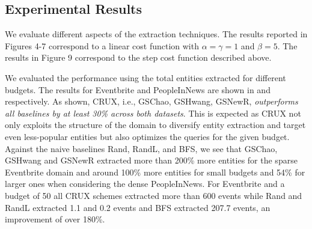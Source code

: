 
\subsection{Experimental Results}
We evaluate different aspects of the extraction techniques.
\iftr
 The results reported in Figures 4-7 correspond to a linear cost function with $\alpha=\gamma=1$ and $\beta=5$. The results in Figure 9 correspond to the step cost function described above.
 \fi

We evaluated the performance using the total entities 
extracted for different budgets. 
The results for Eventbrite and PeopleInNews are shown in  and  respectively. As shown, CRUX, i.e., GSChao, GSHwang, GSNewR, {\em outperforms all baselines by at least 30\% across both datasets}. This is expected as CRUX not only exploits the structure of the domain to diversify entity extraction and target even less-popular entities but also optimizes the queries for the given budget. Against the naive baselines Rand, RandL, and BFS, we see that GSChao, GSHwang and GSNewR extracted more than 200\% more entities for the sparse Eventbrite domain and around 100\% more entities for small budgets and 54\% for larger ones when considering the dense PeopleInNews. For Eventbrite and a budget of 50 all CRUX schemes extracted more than 600 events while Rand and RandL extracted 1.1 and 0.2 events and BFS extracted 207.7 events, an improvement of over 180\%.


